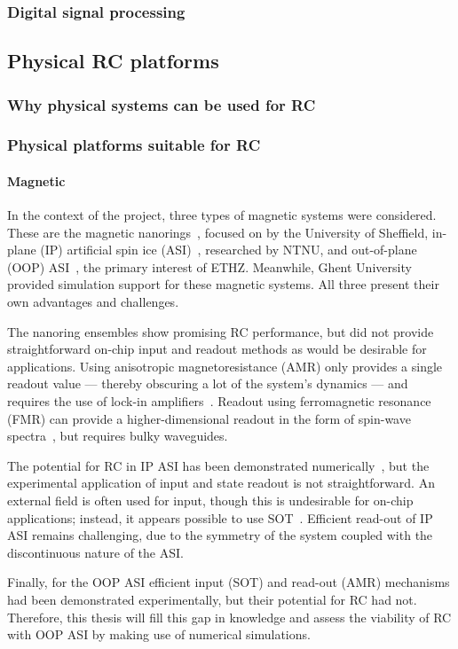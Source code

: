 \subsubsection{Digital signal processing} %
\subsection{Physical RC platforms}
\subsubsection{Why physical systems can be used for RC}
\subsubsection{Physical platforms suitable for RC}
\paragraph{Magnetic} %
In the context of the \spinengine project, three types of magnetic systems were considered.
These are the magnetic nanorings~\cite{DynamicEmergence_NanomagneticSystem}, focused on by the University of Sheffield, in-plane (IP) artificial spin ice (ASI)~\cite{RC_ASI}, researched by NTNU, and out-of-plane (OOP) ASI~\cite{KUR-24}, the primary interest of ETHZ.
Meanwhile, Ghent University provided simulation support for these magnetic systems.
All three present their own advantages and challenges. \par
The nanoring ensembles show promising RC performance, but did not provide straightforward on-chip input and readout methods as would be desirable for applications.
Using anisotropic magnetoresistance (AMR) only provides a single readout value --- thereby obscuring a lot of the system's dynamics --- and requires the use of lock-in amplifiers~\cite{ArchitecturesNanoringRC,Vidamour2023}.
Readout using ferromagnetic resonance (FMR) can provide a higher-dimensional readout in the form of spin-wave spectra~\cite{swindells2024fingerprinting}, but requires bulky waveguides. \par
The potential for RC in IP ASI has been demonstrated numerically~\cite{RC_ASI}, but the experimental application of input and state readout is not straightforward.
An external field is often used for input, though this is undesirable for on-chip applications; instead, it appears possible to use SOT~\cite{SOT_switching_IP}.
Efficient read-out of IP ASI remains challenging, due to the symmetry of the system coupled with the discontinuous nature of the ASI. \par %
Finally, for the OOP ASI efficient input (SOT) and read-out (AMR) mechanisms had been demonstrated experimentally, but their potential for RC had not.
Therefore, this thesis will fill this gap in knowledge and assess the viability of RC with OOP ASI by making use of numerical simulations.
